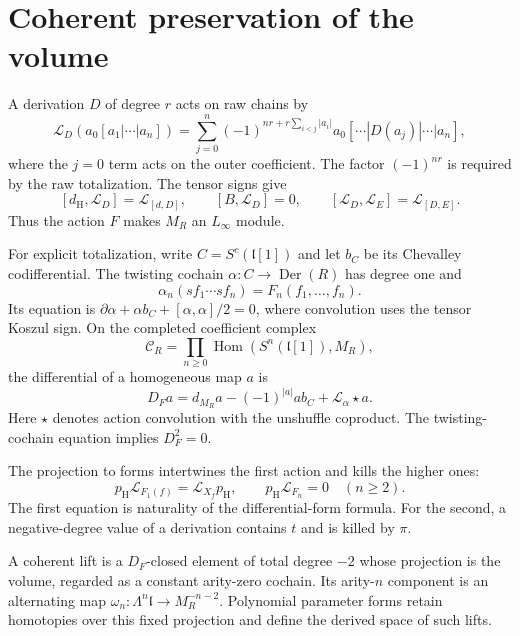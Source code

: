 \section{Coherent preservation of the volume}
\label{sec:vol2-equivariant-cyclic-volume}

A derivation $D$ of degree $r$ acts on raw chains by
\begin{equation}\label{eq:vol2-raw-chain-lie-derivative}
 \mathcal L_D(a_0[a_1|\cdots|a_n])
  =\sum_{j=0}^n(-1)^{nr+r\sum_{i<j}|a_i|}
       a_0[\cdots|D(a_j)|\cdots|a_n],
\end{equation}
where the $j=0$ term acts on the outer coefficient. The factor
$(-1)^{nr}$ is required by the raw totalization. The tensor
signs give
\[
 [d_{\mathrm H},\mathcal L_D]=\mathcal L_{[d,D]},
 \qquad [B,\mathcal L_D]=0,
 \qquad [\mathcal L_D,\mathcal L_E]=\mathcal L_{[D,E]}.
\]
Thus the action $F$ makes $M_R$ an $L_\infty$ module.

For explicit totalization, write $C=S^c(\mathfrak l[1])$ and
let $b_C$ be its Chevalley codifferential. The twisting cochain
$\alpha:C\to\operatorname{Der}(R)$ has degree one and
\[
 \alpha_n(sf_1\cdots sf_n)=F_n(f_1,\ldots,f_n).
\]
Its equation is
$\partial\alpha+\alpha b_C+[\alpha,\alpha]/2=0$,
where convolution uses the tensor Koszul sign. On the completed
coefficient complex
\[
 \mathcal C_R=\prod_{n\geq0}
       \operatorname{Hom}(S^n(\mathfrak l[1]),M_R),
\]
the differential of a homogeneous map $a$ is
\begin{equation}\label{eq:vol2-equivariant-cyclic-differential}
 D_Fa=d_{M_R}a-(-1)^{|a|}a b_C+\mathcal L_\alpha\star a.
\end{equation}
Here $\star$ denotes action convolution with the unshuffle
coproduct.
The twisting-cochain equation implies $D_F^2=0$.

The projection to forms intertwines the first action and kills
the higher ones:
\begin{equation}\label{eq:vol2-equivariant-hkr}
 p_{\mathrm H}\mathcal L_{F_1(f)}
      =\mathcal L_{X_f}p_{\mathrm H},
 \qquad p_{\mathrm H}\mathcal L_{F_n}=0\quad(n\geq2).
\end{equation}
The first equation is naturality of the differential-form
formula. For the second, a negative-degree value of a
derivation contains $t$ and is killed by $\pi$.

A coherent lift is a $D_F$-closed element of total degree
$-2$ whose projection is the volume, regarded as a constant
arity-zero cochain. Its arity-$n$ component is an alternating
map $\omega_n:\Lambda^n\mathfrak l\to M_R^{-n-2}$.
Polynomial parameter forms retain homotopies over this fixed
projection and define the derived space of such lifts.

